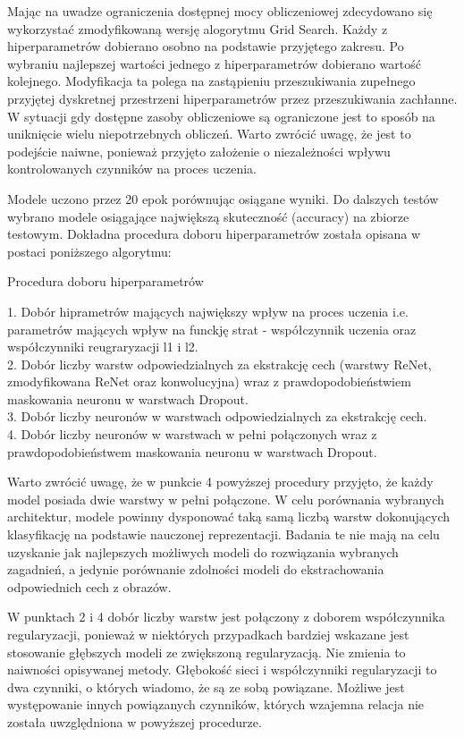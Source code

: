 \documentclass[oneside, mag]{mgr}
\begin{document}
Mając na uwadze ograniczenia dostępnej mocy obliczeniowej zdecydowano się wykorzystać zmodyfikowaną wersję alogorytmu Grid Search. Każdy z hiperparametrów dobierano osobno na podstawie przyjętego zakresu. Po wybraniu najlepszej wartości jednego z hiperparametrów dobierano wartość kolejnego. Modyfikacja ta polega na zastąpieniu przeszukiwania zupełnego przyjętej dyskretnej przestrzeni hiperparametrów przez przeszukiwania zachłanne. W sytuacji gdy dostępne zasoby obliczeniowe są ograniczone jest to sposób na uniknięcie wielu niepotrzebnych obliczeń. Warto zwrócić uwagę, że jest to podejście naiwne, ponieważ przyjęto założenie o niezależności wpływu kontrolowanych czynników na proces uczenia.

Modele uczono przez 20 epok porównując osiągane wyniki. Do dalszych testów wybrano modele osiągające największą skuteczność (accuracy) na zbiorze testowym. Dokładna procedura doboru hiperparametrów została opisana w postaci poniższego algorytmu:

\begin{algorithm}[H]
\SetAlgoLined
\caption{Procedura doboru hiperparametrów}
1. Dobór hiprametrów mających największy wpływ na proces uczenia i.e. parametrów mających wpływ na funckję strat - współczynnik uczenia oraz współczynniki reugraryzacji l1 i l2.\\
2. Dobór liczby warstw odpowiedzialnych za ekstrakcję cech (warstwy ReNet, zmodyfikowana ReNet oraz konwolucyjna) wraz z prawdopodobieństwiem maskowania neuronu w warstwach Dropout.\\
3. Dobór liczby neuronów w warstwach odpowiedzialnych za ekstrakcję cech.\\
4. Dobór liczby neuronów w warstwach w pełni połączonych wraz z prawdopodobieństwem maskowania neuronu w warstwach Dropout.\\
\end{algorithm}

Warto zwrócić uwagę, że w punkcie 4 powyższej procedury przyjęto, że każdy model posiada dwie warstwy w pełni połączone. W celu porównania wybranych architektur, modele powinny dysponować taką samą liczbą warstw dokonujących klasyfikację na podstawie nauczonej reprezentacji. Badania te nie mają na celu uzyskanie jak najlepszych możliwych modeli do rozwiązania wybranych zagadnień, a jedynie porównanie zdolności modeli do ekstrachowania odpowiednich cech z obrazów.

W punktach 2 i 4 dobór liczby warstw jest połączony z doborem współczynnika regularyzacji, ponieważ w niektórych przypadkach bardziej wskazane jest stosowanie głębszych modeli ze zwiększoną regularyzacją. Nie zmienia to naiwności opisywanej metody. Głębokość sieci i współczynniki regularyzacji to dwa czynniki, o których wiadomo, że są ze sobą powiązane. Możliwe jest występowanie innych powiązanych czynników, których wzajemna relacja nie została uwzględniona w powyższej procedurze. 
\end{document}

